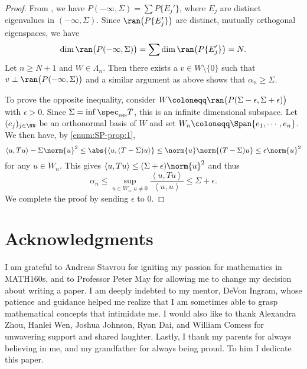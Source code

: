 \documentclass[oneside,reqno,letterpaper]{amsart}
\newcommand{\essspec}{\spec_{\text{ess}}}
\begin{document}
\begin{proof}
  From , we have \(P(-\infty, \Sigma) = \sum P \{E_j'\}\), where \(E_j\) are distinct eigenvalues in \((-\infty, \Sigma)\). 
  Since \(\ran\big(P \{E_j'\} \big)\) are distinct, mutually orthogonal eigenspaces, we have 
  \[
    \dim \ran\big(P(-\infty, \Sigma)\big)
    = \sum \dim \ran\big(P\{E_j'\}\big)
    = N .
  \] 
  Let \(n \geq N + 1\) and \(W \in \Lambda_{n}\). 
  Then there exists a \(v \in W \setminus \{0\}\) such that \(v \perp \ran\big(P(-\infty, \Sigma)\big)\) and a similar argument as above shows that \(\alpha_n \geq \Sigma\). 

  To prove the opposite inequality, consider \(W \coloneqq \ran\big(P(\Sigma - \epsilon, \Sigma + \epsilon)\big)\) with \(\epsilon > 0\). 
  Since \(\Sigma = \inf \essspec T\), this is an infinite dimensional subspace. 
  Let \((e_j)_{j \in \NN}\) be an orthonormal basis of \(W\) and set \(W_n \coloneqq \Span \{e_1, \cdots, e_n\}\).
  We then have, by  \ref{enum:SP-prop:1}, 
  \[
    \left< u, Tu \right> - \Sigma \norm{u}^2  
    \leq \abs{\left< u, (T - \Sigma)u \right>} 
    \leq \norm{u} \norm{(T - \Sigma)u} 
    \leq \epsilon \norm{u}^2 
  \] 
  for any \(u \in W_n\). 
  This gives \(\left< u, Tu \right> \leq (\Sigma + \epsilon) \norm{u}^2 \) and thus
  \[
    \alpha_n \leq \sup_{u \in W_n, u \neq 0} \frac{\left< u, Tu \right>}{\left< u, u \right>} \leq \Sigma + \epsilon . 
  \] 
  We complete the proof by sending \(\epsilon\) to \(0\). 
\end{proof}







\section*{Acknowledgments}
I am grateful to Andreas Stavrou for igniting my passion for mathematics in MATH160s, and to Professor Peter May for allowing me to change my decision about writing a paper.
I am deeply indebted to my mentor, DeVon Ingram, whose patience and guidance helped me realize that I am sometimes able to grasp mathematical concepts that intimidate me. 
I would also like to thank Alexandra Zhou, Hanlei Wen, Joshua Johnson, Ryan Dai, and William Comess for unwavering support and shared laughter. 
Lastly, I thank my parents for always believing in me, and my grandfather for always being proud. 
To him I dedicate this paper. 







\printbibliography
\nocite{*}
\end{document}
